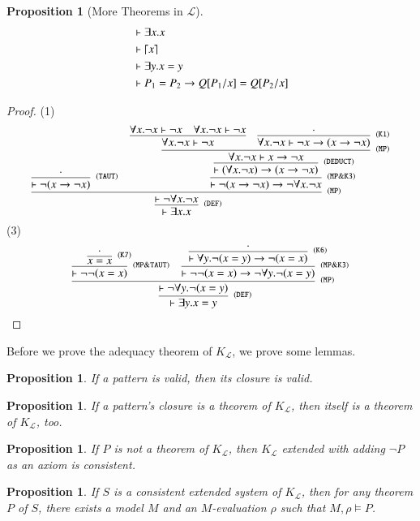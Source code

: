 \documentclass{article}
\newtheorem{prop}[thm]{Proposition}
\DeclarePairedDelimiter\ceil{\lceil}{\rceil}
\begin{document}
\begin{prop}[More Theorems in $\mathcal{L}$]
\begin{align*}
&\vdash \exists x . x \\
&\vdash \ceil*{x} \\
&\vdash \exists y . x = y \\
&\vdash P_1 = P_2 \to Q[P_1 / x] = Q[P_2 / x]
\end{align*}
\end{prop}
\begin{proof}
(1)
$$
\infer[^{\tt (DEF)}]{\vdash \exists x . x}
{\infer[^{\tt (MP)}]{\vdash \neg \forall x . \neg x}
	{\infer[^{\tt (TAUT)}]{\vdash \neg (x \to \neg x)}{\cdot}
		&{\infer[^{\tt (MP\&K3)}] 
	{\vdash \neg (x \to \neg x) \to \neg \forall x . \neg x}
	{\infer[^{\tt (DEDUCT)}]
	{\vdash (\forall x . \neg x) \to (x \to \neg x)}
	{\infer[^{\tt (MP)}]{\forall x . \neg x \vdash x \to \neg x}
		{{\infer{\forall x . \neg x \vdash \neg x}
{\forall x . \neg x \vdash \neg x
&\forall x . \neg x \vdash \neg x}}
	    &{\infer[^{\tt (K1)}]{\forall x . \neg x \vdash \neg x \to (x \to \neg x)}{\cdot}}
}}}}}}
$$
(3)
$$
\infer[^{\tt (DEF)}]{\vdash \exists y . x = y}
      {\infer[^{\tt (MP)}]{\vdash \neg \forall y . \neg (x = y)}
      	     {\infer[^{\tt (MP\&TAUT)}]{\vdash \neg \neg (x = x)}
      	     	    {\infer[^{\tt (K7)}]{x = x}{\cdot}}
             &\infer[^{\tt (MP\&K3)}]{\vdash \neg \neg (x = x) \to  \neg \forall y . \neg (x = y)}
                    {\infer[^{\tt {(K6)}}]{\vdash \forall y . \neg (x = y) \to  \neg (x = x)}{\cdot}}}}
$$

\end{proof}

Before we prove the adequacy theorem of $K_\mathcal{L}$, we prove some lemmas.

\begin{prop}
If a pattern is valid, then its closure is valid.
\end{prop}

\begin{prop}
If a pattern's closure is a theorem of $K_\mathcal{L}$, then itself is a theorem of $K_\mathcal{L}$, too.
\end{prop}

\begin{prop}
If $P$ is not a theorem of $K_\mathcal{L}$, then $K_\mathcal{L}$ extended with adding $\neg P$ as an axiom is consistent.
\end{prop}

\begin{prop}
If $S$ is a consistent extended system of $K_\mathcal{L}$, then for any theorem $P$ of $S$, there exists a model $M$ and an $M$-evaluation $\rho$ such that $M,\rho \vDash P$.
\end{prop}
\end{document}
